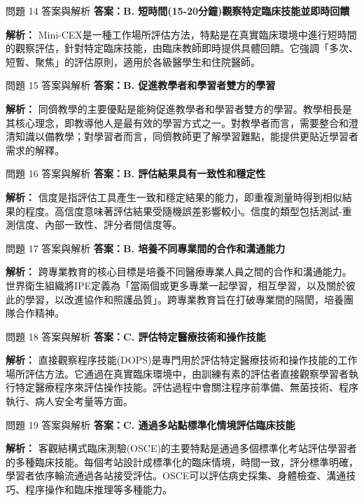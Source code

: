 \documentclass[aspectratio=169]{beamer}
\begin{document}
\begin{frame}{問題 14 答案與解析}
  \textbf{答案：B. 短時間(15-20分鐘)觀察特定臨床技能並即時回饋}
  
  \textbf{解析：} Mini-CEX是一種工作場所評估方法，特點是在真實臨床環境中進行短時間的觀察評估，針對特定臨床技能，由臨床教師即時提供具體回饋。它強調「多次、短暫、聚焦」的評估原則，適用於各級醫學生和住院醫師。
\end{frame}

\begin{frame}{問題 15 答案與解析}
  \textbf{答案：B. 促進教學者和學習者雙方的學習}
  
  \textbf{解析：} 同儕教學的主要優點是能夠促進教學者和學習者雙方的學習。教學相長是其核心理念，即教導他人是最有效的學習方式之一。對教學者而言，需要整合和澄清知識以備教學；對學習者而言，同儕教師更了解學習難點，能提供更貼近學習者需求的解釋。
\end{frame}

\begin{frame}{問題 16 答案與解析}
  \textbf{答案：B. 評估結果具有一致性和穩定性}
  
  \textbf{解析：} 信度是指評估工具產生一致和穩定結果的能力，即重複測量時得到相似結果的程度。高信度意味著評估結果受隨機誤差影響較小。信度的類型包括測試-重測信度、內部一致性、評分者間信度等。
\end{frame}

\begin{frame}{問題 17 答案與解析}
  \textbf{答案：B. 培養不同專業間的合作和溝通能力}
  
  \textbf{解析：} 跨專業教育的核心目標是培養不同醫療專業人員之間的合作和溝通能力。世界衛生組織將IPE定義為「當兩個或更多專業一起學習，相互學習，以及關於彼此的學習，以改進協作和照護品質」。跨專業教育旨在打破專業間的隔閡，培養團隊合作精神。
\end{frame}

\begin{frame}{問題 18 答案與解析}
  \textbf{答案：C. 評估特定醫療技術和操作技能}
  
  \textbf{解析：} 直接觀察程序技能(DOPS)是專門用於評估特定醫療技術和操作技能的工作場所評估方法。它通過在真實臨床環境中，由訓練有素的評估者直接觀察學習者執行特定醫療程序來評估操作技能。評估過程中會關注程序前準備、無菌技術、程序執行、病人安全考量等方面。
\end{frame}

\begin{frame}{問題 19 答案與解析}
  \textbf{答案：C. 通過多站點標準化情境評估臨床技能}
  
  \textbf{解析：} 客觀結構式臨床測驗(OSCE)的主要特點是通過多個標準化考站評估學習者的多種臨床技能。每個考站設計成標準化的臨床情境，時間一致，評分標準明確，學習者依序輪流通過各站接受評估。OSCE可以評估病史採集、身體檢查、溝通技巧、程序操作和臨床推理等多種能力。
\end{frame}
\end{document}
